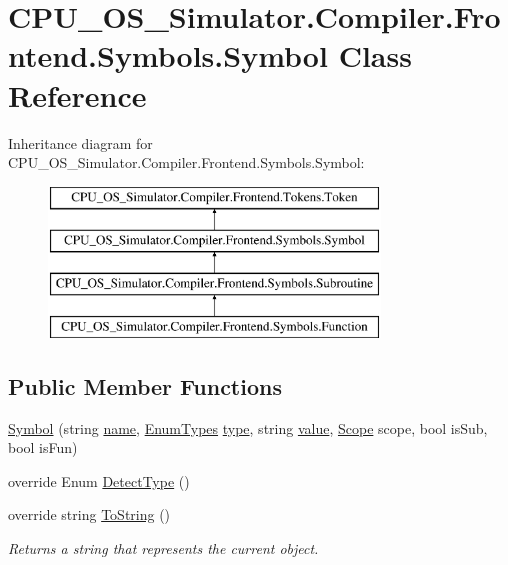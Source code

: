 \hypertarget{class_c_p_u___o_s___simulator_1_1_compiler_1_1_frontend_1_1_symbols_1_1_symbol}{}\section{C\+P\+U\+\_\+\+O\+S\+\_\+\+Simulator.\+Compiler.\+Frontend.\+Symbols.\+Symbol Class Reference}
\label{class_c_p_u___o_s___simulator_1_1_compiler_1_1_frontend_1_1_symbols_1_1_symbol}
Inheritance diagram for C\+P\+U\+\_\+\+O\+S\+\_\+\+Simulator.\+Compiler.\+Frontend.\+Symbols.\+Symbol\+:\begin{figure}[H]
\begin{center}
\leavevmode
\includegraphics[height=4.000000cm]{class_c_p_u___o_s___simulator_1_1_compiler_1_1_frontend_1_1_symbols_1_1_symbol}
\end{center}
\end{figure}
\subsection*{Public Member Functions}
\begin{DoxyCompactItemize}
\item 
\hyperlink{class_c_p_u___o_s___simulator_1_1_compiler_1_1_frontend_1_1_symbols_1_1_symbol_ab5a7816e54de7e605bc76784d1107129}{Symbol} (string \hyperlink{class_c_p_u___o_s___simulator_1_1_compiler_1_1_frontend_1_1_symbols_1_1_symbol_a04abf6b34d531519f4f515f3a51e2089}{name}, \hyperlink{namespace_c_p_u___o_s___simulator_1_1_compiler_1_1_frontend_1_1_tokens_a7c0cc43763cc9d01c7d5af34d70b96ea}{Enum\+Types} \hyperlink{class_c_p_u___o_s___simulator_1_1_compiler_1_1_frontend_1_1_tokens_1_1_token_a7ec4dbbde477cd373f8135f0c843a346}{type}, string \hyperlink{class_c_p_u___o_s___simulator_1_1_compiler_1_1_frontend_1_1_symbols_1_1_symbol_a8c243f84c23afefc2b1c26180e187013}{value}, \hyperlink{class_c_p_u___o_s___simulator_1_1_compiler_1_1_frontend_1_1_symbols_1_1_scope}{Scope} scope, bool is\+Sub, bool is\+Fun)
\item 
override Enum \hyperlink{class_c_p_u___o_s___simulator_1_1_compiler_1_1_frontend_1_1_symbols_1_1_symbol_a1aef3417bc03adb5bcc15cfcdedb834e}{Detect\+Type} ()
\item 
override string \hyperlink{class_c_p_u___o_s___simulator_1_1_compiler_1_1_frontend_1_1_symbols_1_1_symbol_a1f87c771259b30006f0473b37d874847}{To\+String} ()
\begin{DoxyCompactList}\small\item\em Returns a string that represents the current object. \end{DoxyCompactList}\end{DoxyCompactItemize}
